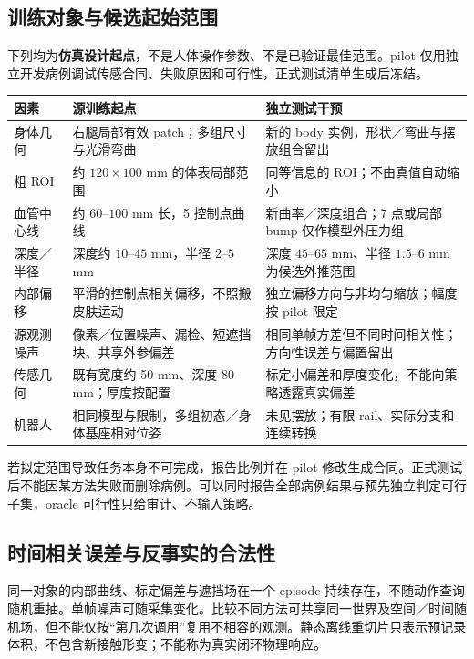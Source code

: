 \documentclass[UTF8,fontset=fandol,11pt,a4paper]{ctexart}
\theoremstyle{plain}
\theoremstyle{definition}
\theoremstyle{remark}
\numberwithin{equation}{section}
\begin{document}
\subsection{训练对象与候选起始范围}
下列均为\textbf{仿真设计起点}，不是人体操作参数、不是已验证最佳范围。pilot 仅用独立开发病例调试传感合同、失败原因和可行性，正式测试清单生成后冻结。
\begin{longtable}{P{38mm}P{50mm}P{58mm}}
\toprule 因素 & 源训练起点 & 独立测试干预\\\midrule\endhead
身体几何 & 右腿局部有效 patch；多组尺寸与光滑弯曲 & 新的 body 实例，形状／弯曲与摆放组合留出\\
粗 ROI & 约 $120\times100$ mm 的体表局部范围 & 同等信息的 ROI；不由真值自动缩小\\
血管中心线 & 约 $60$--$100$ mm 长，5 控制点曲线 & 新曲率／深度组合；7 点或局部 bump 仅作模型外压力组\\
深度／半径 & 深度约 $10$--$45$ mm，半径 $2$--$5$ mm & 深度 $45$--$65$ mm、半径 $1.5$--$6$ mm 为候选外推范围\\
内部偏移 & 平滑的控制点相关偏移，不照搬皮肤运动 & 独立偏移方向与非均匀缩放；幅度按 pilot 限定\\
源观测噪声 & 像素／位置噪声、漏检、短遮挡块、共享外参偏差 & 相同单帧方差但不同时间相关性；方向性误差与偏置留出\\
传感几何 & 既有宽度约 50 mm、深度 80 mm；厚度按配置 & 标定小偏差和厚度变化，不能向策略透露真实偏差\\
机器人 & 相同模型与限制，多组初态／身体基座相对位姿 & 未见摆放；有限 rail、实际分支和连续转换\\\bottomrule
\end{longtable}
若拟定范围导致任务本身不可完成，报告比例并在 pilot 修改生成合同。正式测试后不能因某方法失败而删除病例。可以同时报告全部病例结果与预先独立判定可行子集，oracle 可行性只给审计、不输入策略。

\subsection{时间相关误差与反事实的合法性}
同一对象的内部曲线、标定偏差与遮挡场在一个 episode 持续存在，不随动作查询随机重抽。单帧噪声可随采集变化。比较不同方法可共享同一世界及空间／时间随机场，但不能仅按“第几次调用”复用不相容的观测。静态离线重切片只表示预记录体积，不包含新接触形变；不能称为真实闭环物理响应。
\end{document}
